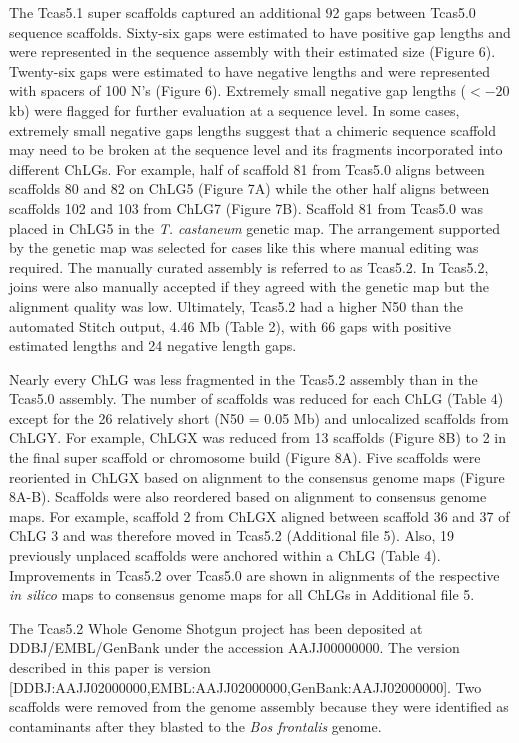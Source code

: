 \documentclass{bmcart}
\begin{document}
The Tcas5.1 super scaffolds captured an additional 92 gaps between Tcas5.0 sequence scaffolds. Sixty-six gaps were estimated to have positive gap lengths and were represented in the sequence assembly with their estimated size (Figure 6). Twenty-six gaps were estimated to have negative lengths and were represented with spacers of 100 N's (Figure 6). Extremely small negative gap lengths ($< -20$ kb) were flagged for further evaluation at a sequence level. In some cases, extremely small negative gaps lengths suggest that a chimeric sequence scaffold may need to be broken at the sequence level and its fragments incorporated into different ChLGs. For example, half of scaffold 81 from Tcas5.0 aligns between scaffolds 80 and 82 on ChLG5 (Figure 7A) while the other half aligns between scaffolds 102 and 103 from ChLG7 (Figure 7B). Scaffold 81 from Tcas5.0 was placed in ChLG5 in the \textit{T. castaneum} genetic map. The arrangement supported by the genetic map was selected for cases like this where manual editing was required. The manually curated assembly is referred to as Tcas5.2. In Tcas5.2, joins were also manually accepted if they agreed with the genetic map but the alignment quality was low. Ultimately, Tcas5.2 had a higher N50 than the automated Stitch output, 4.46 Mb (Table 2), with 66 gaps with positive estimated lengths and 24 negative length gaps. 


Nearly every ChLG was less fragmented in the Tcas5.2 assembly than in the Tcas5.0 assembly. The number of scaffolds was reduced for each ChLG (Table 4) except for the 26 relatively short (N50 = 0.05 Mb) and unlocalized scaffolds from ChLGY. For example, ChLGX was reduced from 13 scaffolds (Figure 8B) to 2 in the final super scaffold or chromosome build (Figure 8A). Five scaffolds were reoriented in ChLGX based on alignment to the consensus genome maps (Figure 8A-B). Scaffolds were also reordered based on alignment to consensus genome maps. For example, scaffold 2 from ChLGX aligned between scaffold 36 and 37 of ChLG 3 and was therefore moved in Tcas5.2 (Additional file 5). Also, 19 previously unplaced scaffolds were anchored within a ChLG (Table 4). Improvements in Tcas5.2 over Tcas5.0 are shown in alignments of the respective \textit{in silico} maps to consensus genome maps for all ChLGs in Additional file 5.


The Tcas5.2 Whole Genome Shotgun project has been deposited at DDBJ/EMBL/GenBank under the accession AAJJ00000000. The version described in this paper is version [DDBJ:AAJJ02000000,EMBL:AAJJ02000000,GenBank:AAJJ02000000]. Two scaffolds were removed from the genome assembly because they were identified as contaminants after they blasted to the \textit{Bos frontalis} genome.
\end{document}

